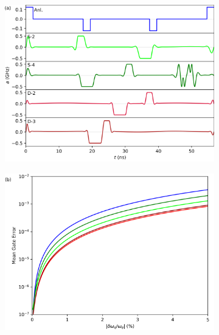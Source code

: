 \documentclass[
  amsfonts,
  amsmath,
  tbtags,
  amssymb,
  aps,
  nobibnotes,
  twocolumn,
]{revtex4-2}
\begin{document}
\begin{figure}[ht]
  \begin{subfigure}{.49\linewidth}
    \label{fig:5.1:a}
    \includegraphics[width=\linewidth]{assets/f2a.png}
  \end{subfigure}%
  \begin{subfigure}{.49\linewidth}
    \label{fig:5.1:b}
    \includegraphics[width=\linewidth]{assets/f2b.png}
  \end{subfigure}
  

\end{figure}
\end{document}
